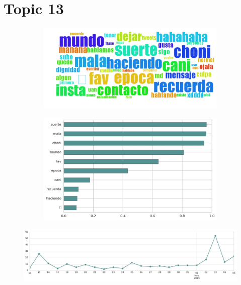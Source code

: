 \section{Topic 13}

\begin{figure}[htbp!]
    \centering
    \begin{subfigure}[b]{0.49\textwidth}
        \includegraphics[width=\textwidth]{twitter_all/report_images/topic-13-wordcloud.jpg}
    \end{subfigure}
    \begin{subfigure}[b]{0.49\textwidth}
        \includegraphics[width=\textwidth]{twitter_all/report_images/topic-13-terms.jpg}
    \end{subfigure}
\end{figure}

\begin{figure}[htbp!]
    \centering
    \includegraphics[width=\textwidth]{twitter_all/report_images/topic-13-timeseries.jpg}
\end{figure}

